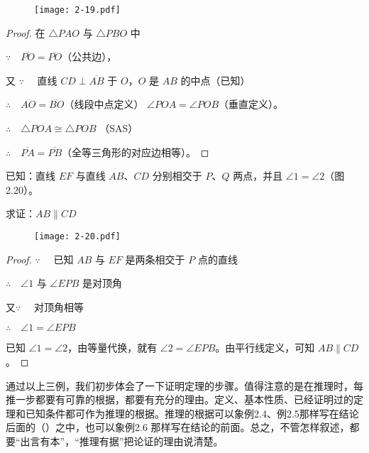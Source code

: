\begin{figure}
	\texttt{[image: 2-19.pdf]}
	\caption{}\label{fig:2-19}
\end{figure}

\begin{proof}
在 $\triangle PAO$ 与 $\triangle PBO$ 中

$\because\quad \overline{PO}=\overline{PO}$（公共边），

又 $\because\quad $ 直线 $CD\perp\overline{AB}$ 于 $O$，$O$ 是 $AB$ 的中点（已知）

$\therefore\quad \overline{AO}=\overline{BO}$（线段中点定义） $\angle POA=\angle POB$（垂直定义）。

$\therefore\quad \triangle POA\cong \triangle POB$ （SAS）

$\therefore\quad \overline{PA}=\overline{PB}$（全等三角形的对应边相等）。
\end{proof}

\begin{example}
已知：直线 $EF$ 与直线 $AB$、$CD$ 分别相交于 $P$、$Q$ 两点，并且 $\angle 1=\angle 2$（图2.20）。

求证：$AB\parallel CD$
\end{example}

\begin{figure}
  \texttt{[image: 2-20.pdf]}
	\caption{}\label{fig:2-20}
\end{figure}

\begin{proof}
$\because\quad$ 已知 $AB$ 与 $EF$ 是两条相交于 $P$ 点的直线

$\therefore\quad \angle 1$ 与 $\angle EPB$ 是对顶角

又$\because\quad$ 对顶角相等

$\therefore\quad \angle 1=\angle EPB$

已知 $\angle 1=\angle 2$，由等量代换，就有 $\angle 2=\angle EPB$。由平行线定义，可知 $AB\parallel CD$。
\end{proof}

通过以上三例，我们初步体会了一下证明定理的步骤。值得注意的是在推理时，每推一步都要有可靠的根据，都要有充分的理由。定义、基本性质、已经证明过的定理和已知条件都可作为推理的根据。推理的根据可以象例2.4、例2.5那样写在结论后面的（\qquad）之中，也可以象例2.6 那样写在结论的前面。总之，不管怎样叙述，都要“出言有本”，“推理有据”把论证的理由说清楚。

